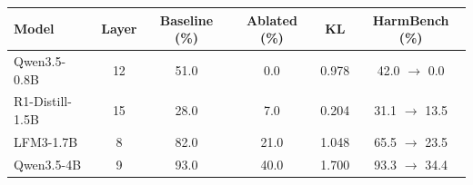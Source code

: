 \begin{tabular}{lccccc}
\toprule
Model & Layer & Baseline (\%) & Ablated (\%) & KL & HarmBench (\%) \\
\midrule
Qwen3.5-0.8B & 12 & 51.0 & 0.0 & 0.978 & 42.0 $\to$ 0.0 \\
R1-Distill-1.5B & 15 & 28.0 & 7.0 & 0.204 & 31.1 $\to$ 13.5 \\
LFM3-1.7B & 8 & 82.0 & 21.0 & 1.048 & 65.5 $\to$ 23.5 \\
Qwen3.5-4B & 9 & 93.0 & 40.0 & 1.700 & 93.3 $\to$ 34.4 \\
\bottomrule
\end{tabular}